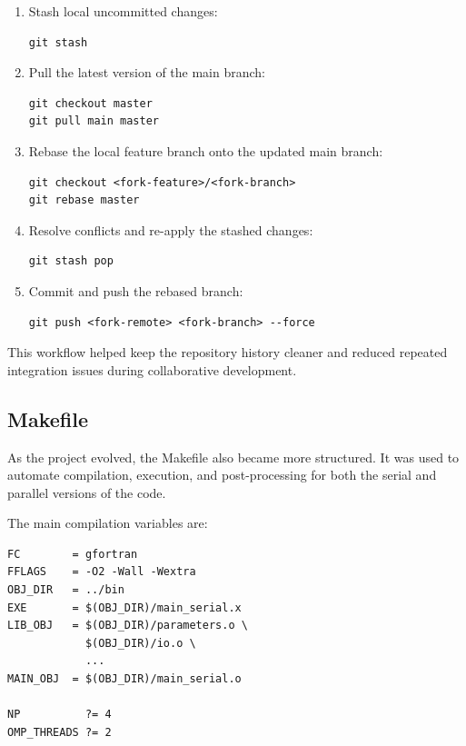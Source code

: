 \begin{enumerate}
  \item Stash local uncommitted changes:
\begin{lstlisting}
git stash
\end{lstlisting}

  \item Pull the latest version of the main branch:
\begin{lstlisting}
git checkout master
git pull main master
\end{lstlisting}

  \item Rebase the local feature branch onto the updated main branch:
\begin{lstlisting}
git checkout <fork-feature>/<fork-branch>
git rebase master
\end{lstlisting}

  \item Resolve conflicts and re-apply the stashed changes:
\begin{lstlisting}
git stash pop
\end{lstlisting}

  \item Commit and push the rebased branch:
\begin{lstlisting}
git push <fork-remote> <fork-branch> --force
\end{lstlisting}
\end{enumerate}

This workflow helped keep the repository history cleaner and reduced repeated integration issues during collaborative development.

\subsection{Makefile}\label{makefile}

As the project evolved, the Makefile also became more structured. It was used to automate compilation, execution, and post-processing for both the serial and parallel versions of the code.

The main compilation variables are:

\begin{lstlisting}
FC        = gfortran
FFLAGS    = -O2 -Wall -Wextra
OBJ_DIR   = ../bin
EXE       = $(OBJ_DIR)/main_serial.x
LIB_OBJ   = $(OBJ_DIR)/parameters.o \
            $(OBJ_DIR)/io.o \
            ...
MAIN_OBJ  = $(OBJ_DIR)/main_serial.o

NP          ?= 4
OMP_THREADS ?= 2
\end{lstlisting}

